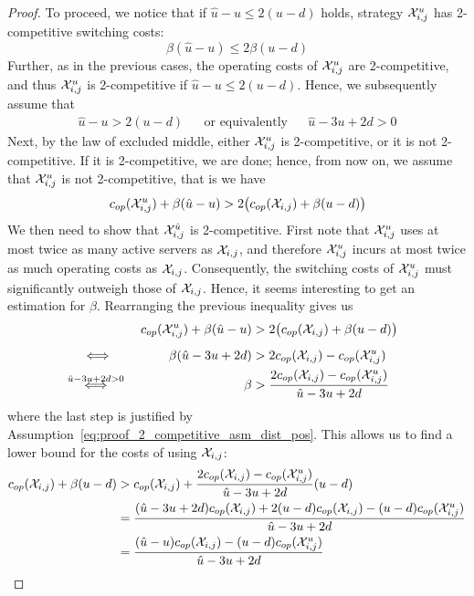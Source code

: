 \begin{proof}
To proceed, we notice that if $\hat{u}-u\le2(u-d)$ holds, strategy $\mathcal{X}_{i,j}^u$ has 2-competitive switching costs:
\begin{equation*}
	\beta(\hat{u}-u)\le2\beta(u-d)
\end{equation*}
Further, as in the previous cases, the operating costs of $\mathcal{X}_{i,j}^u$ are 2-competitive, and thus $\mathcal{X}_{i,j}^u$ is 2-competitive if $\hat{u}-u\le2(u-d)$. Hence, we subsequently assume that 
\begin{align}\label{eq:proof_2_competitive_asm_dist_pos}
	\hat{u}-u>2(u-d)&&\text{or equivalently}&&\hat{u}-3u+2d>0
\end{align}
Next, by the law of excluded middle, either $\mathcal{X}_{i,j}^u$ is 2-competitive, or it is not 2-competitive. If it is 2-competitive, we are done; hence, from now on, we assume that $\mathcal{X}_{i,j}^u$ is not 2-competitive, that is we have 
\begin{equation*}
	c_{op}(\mathcal{X}_{i,j}^u)+\beta(\hat{u}-u)>2\bigl(c_{op}(\mathcal{X}_{i,j})+\beta(u-d)\bigr)
\end{equation*}
We then need to show that $\mathcal{X}_{i,j}^{\hat{u}}$ is 2-competitive.
First note that $\mathcal{X}_{i,j}^u$ uses at most twice as many active servers as $\mathcal{X}_{i,j}$, and therefore $\mathcal{X}_{i,j}^u$ incurs at most twice as much operating costs as $\mathcal{X}_{i,j}$. Consequently, the switching costs of $\mathcal{X}_{i,j}^u$ must significantly outweigh those of $\mathcal{X}_{i,j}$. Hence, it seems interesting to get an estimation for $\beta$. Rearranging the previous inequality gives us
\begin{align*}
	&&\opcosts(\mx_{i,j}^u)+\beta(\hat{u}-u)&>2\bigl(\opcosts(\mx_{i,j})+\beta(u-d)\bigr)&\\
	&\stackrel{\phantom{\hat{u}-3u+2d)>0}}{\iff}&\beta(\hat{u}-3u+2d)&>2\opcosts(\mx_{i,j})-\opcosts(\mx_{i,j}^u)&\\
	&\stackrel{\hat{u}-3u+2d>0}{\iff}&\beta&>\frac{2\opcosts(\mx_{i,j})-\opcosts(\mx_{i,j}^u)}{\hat{u}-3u+2d}
\end{align*}
where the last step is justified by Assumption~\eqref{eq:proof_2_competitive_asm_dist_pos}.
This allows us to find a lower bound for the costs of using $\mathcal{X}_{i,j}$:
\begin{align*}
	\opcosts(\mx_{i,j})+\beta(u-d)&>\opcosts(\mx_{i,j})+\frac{2\opcosts(\mx_{i,j})-\opcosts(\mx_{i,j}^u)}{\hat{u}-3u+2d}(u-d)\\
	&=\frac{(\hat{u}-3u+2d)\opcosts(\mx_{i,j})+2(u-d)\opcosts(\mx_{i,j})-(u-d)\opcosts(\mx_{i,j}^u)}{\hat{u}-3u+2d}\\
	&=\frac{(\hat{u}-u)\opcosts(\mx_{i,j})-(u-d)\opcosts(\mx_{i,j}^u)}{\hat{u}-3u+2d}

\end{align*}
\end{proof}
